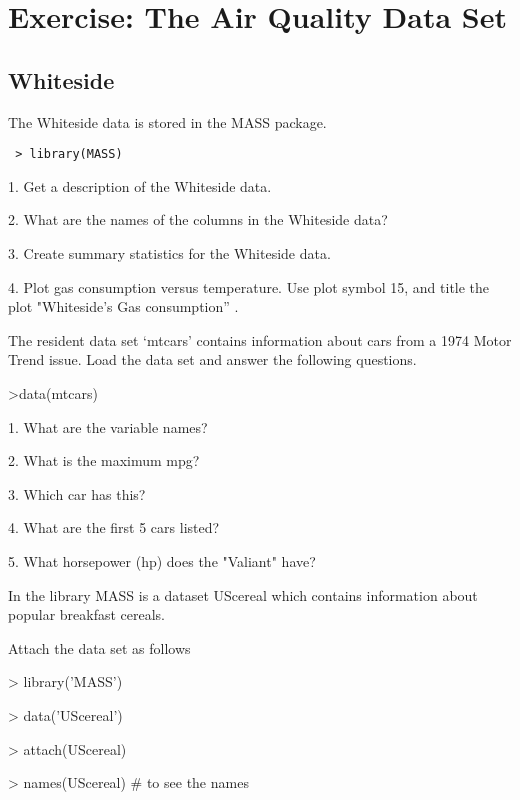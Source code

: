 \documentclass[a4paper,12pt]{article}
\begin{document}
\section*{Exercise:  The Air Quality Data Set}

\subsection*{Whiteside}
 
 
 
 The Whiteside data is stored in the MASS package.
 
 \begin{framed}
 \begin{verbatim}
 > library(MASS)
 \end{verbatim}
 \end{framed}
 
 1.
 Get a description of the Whiteside data.
 
 2.
 What are the names of the columns in the Whiteside data?
 
 3.
 Create summary statistics for the Whiteside data.
 
 4.
 Plot gas consumption versus temperature. Use plot symbol 15, and title the plot "Whiteside’s Gas consumption” .
 
\newpage
The resident data set ‘mtcars’ contains information about cars from a 1974 Motor Trend issue. Load the data set and answer the following questions.

>data(mtcars)



1. What are the variable names?

2. What is the maximum mpg?

3. Which car has this?

4. What are the first 5 cars listed?

5. What horsepower (hp) does the "Valiant" have?

\newpage
 

In the library MASS is a dataset UScereal which contains information about popular breakfast cereals.

 

Attach the data set as follows

> library('MASS')

> data('UScereal')

> attach(UScereal)

> names(UScereal)         # to see the names
\end{document}
